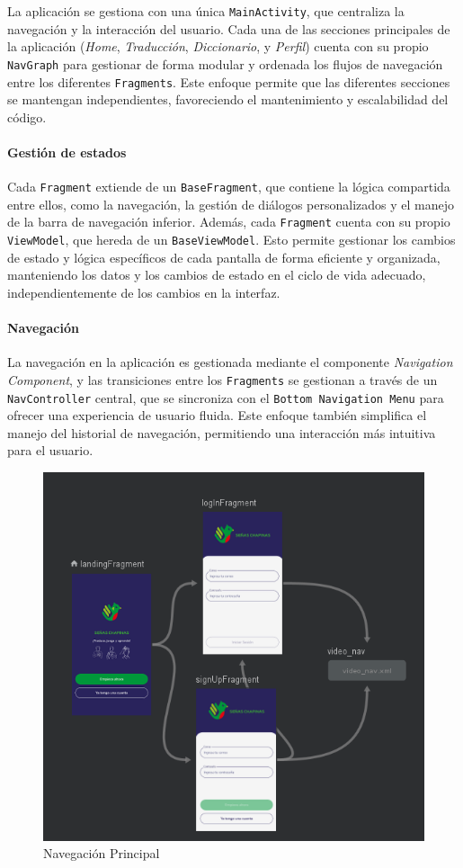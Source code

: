 La aplicación se gestiona con una única \texttt{MainActivity}, que centraliza la navegación y la interacción del usuario. Cada una de las secciones principales de la aplicación (\textit{Home}, \textit{Traducción}, \textit{Diccionario}, y \textit{Perfil}) cuenta con su propio \texttt{NavGraph} para gestionar de forma modular y ordenada los flujos de navegación entre los diferentes \texttt{Fragments}. Este enfoque permite que las diferentes secciones se mantengan independientes, favoreciendo el mantenimiento y escalabilidad del código.

\paragraph{Gestión de estados}

Cada \texttt{Fragment} extiende de un \texttt{BaseFragment}, que contiene la lógica compartida entre ellos, como la navegación, la gestión de diálogos personalizados y el manejo de la barra de navegación inferior. Además, cada \texttt{Fragment} cuenta con su propio \texttt{ViewModel}, que hereda de un \texttt{BaseViewModel}. Esto permite gestionar los cambios de estado y lógica específicos de cada pantalla de forma eficiente y organizada, manteniendo los datos y los cambios de estado en el ciclo de vida adecuado, independientemente de los cambios en la interfaz.

\paragraph{Navegación}

La navegación en la aplicación es gestionada mediante el componente \textit{Navigation Component}, y las transiciones entre los \texttt{Fragments} se gestionan a través de un \texttt{NavController} central, que se sincroniza con el \texttt{Bottom Navigation Menu} para ofrecer una experiencia de usuario fluida. Este enfoque también simplifica el manejo del historial de navegación, permitiendo una interacción más intuitiva para el usuario.

\begin{figure} [H]
    \centering
    \includegraphics[width=0.5\linewidth]{figuras/navegacion_principal.png}
    \caption{Navegación Principal}
    \label{fig:enter-label}
\end{figure}

